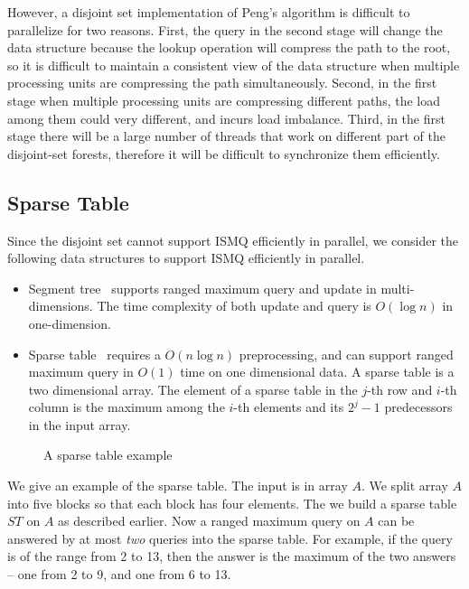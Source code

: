 However, a disjoint set implementation of Peng's algorithm is difficult
to parallelize for two reasons.  First, the query in the second stage
will change the data structure because the lookup operation will
compress the path to the root, so it is difficult to maintain a
consistent view of the data structure when multiple processing units are
compressing the path simultaneously.  Second, in the first stage when
multiple processing units are compressing different paths, the load
among them could very different, and incurs load imbalance.  Third, in
the first stage there will be a large number of threads that work on
different part of the disjoint-set forests, therefore it will be
difficult to synchronize them efficiently.

\subsection{Sparse Table}

Since the disjoint set cannot support ISMQ efficiently in parallel, we
consider the following data structures to support ISMQ efficiently in
parallel.

\begin{itemize}
  \item Segment tree~\cite{berg2000computational} supports ranged
    maximum query and update in multi-dimensions.  The time complexity
    of both update and query is $O(\log n)$ in one-dimension.
  \item Sparse table~\cite{Berkman1993RecursiveSP} requires a $O(n
    \log n)$ preprocessing, and can support ranged maximum query in
    $O(1)$ time on one dimensional data.  A sparse table is a two
    dimensional array.  The element of a sparse table in the $j$-th
    row and $i$-th column is the maximum among the $i$-th elements
    and its $2^j - 1$ predecessors in the input array.
\end{itemize}

\begin{figure}[!thb]
  \centering {} 
  \caption{A sparse table example}
  \label{fig:interval-decomposition}
\end{figure}

We give an example of the sparse table.  The input is in array $A$. We
split array $A$ into five blocks so that each block has four elements.
The we build a sparse table $ST$ on $A$ as described earlier.  Now a
ranged maximum query on $A$ can be answered by at most {\em two}
queries into the sparse table.  For example, if the query is of the
range from 2 to 13, then the answer is the maximum of the two answers
-- one from 2 to 9, and one from 6 to 13.

